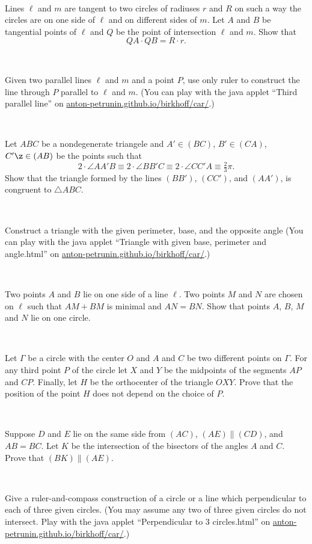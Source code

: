 \documentclass[oneside,a4paper]{article}
\begin{document}
\ 

  Lines $\ell$ and $m$ are tangent to two circles of radiuses $r$ and $R$ on such
a way the circles are on one side of $\ell$ and on different sides of $m$. 
Let $A$ and $B$ be
tangential points of $\ell$ and $Q$ be the point of intersection $\ell$ and $m$. 
Show that
$$QA\cdot QB = R\cdot r.$$

\ 

 Given two parallel lines $\ell$ and $m$ and a point $P$, use only ruler to construct the line through $P$ parallel to $\ell$ and $m$.
(You can play with the java applet ``Third parallel line'' on  \href{http://anton-petrunin.github.io/birkhoff/car/}{anton-petrunin.github.io/birkhoff/car/}.)

\ 

 Let $ABC$ be a nondegenerate triangele and $A'\in (BC)$, $B'\in (CA)$, $C'\z\in (AB)$ be the points such that 
\[2\cdot \angle AA'B\equiv 2\cdot \angle BB'C\equiv 2\cdot \angle CC'A\equiv \tfrac23\pi.\]
Show that the triangle formed by the lines $(BB')$, $(CC')$, and $(AA')$, is congruent to  $\triangle ABC$.

\ 

 Construct a triangle with the given perimeter, base, and the opposite angle
(You can play with the java applet ``Triangle with given base, perimeter and angle.html'' on  \href{http://anton-petrunin.github.io/birkhoff/car/}{anton-petrunin.github.io/birkhoff/car/}.)

\ 

 Two points $A$ and $B$ lie on one side of a line $\ell$. 
Two points $M$ and $N$ are chosen on $\ell$ such that $AM + BM$ is minimal and $AN = BN$. 
Show that points $A$, $B$, $M$ and $N$ lie on one circle.


\ 

Let $\Gamma$ be a circle with the center $O$ and $A$ and $C$ be two different points on $\Gamma$. For any third point $P$ of the circle let $X$ and $Y$ be the midpoints of the segments $AP$ and $CP$. Finally, let $H$ be the orthocenter of the triangle $OXY$. Prove that the position of the point $H$ does not depend on the choice of $P$.

\ 

Suppose $D$ and $E$ lie on the same side from $(AC)$, $(AE)\parallel (CD)$, and $AB=BC$.
Let $K$ be the intersection of the bisectors of the angles $A$ and $C$.
Prove that $(BK) \parallel (AE)$.

\ 

 Give a ruler-and-compass construction of a circle or a line which perpendicular to each of three given circles. 
(You may assume any two of three given circles do not intersect. Play with the java applet ``Perpendicular to 3 circles.html'' on  \href{http://anton-petrunin.github.io/birkhoff/car/}{anton-petrunin.github.io/birkhoff/car/}.)
\end{document}
